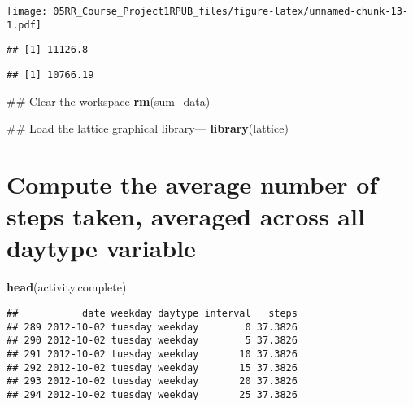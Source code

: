 \documentclass[]{article}
\newenvironment{Shaded}{\begin{snugshade}}{\end{snugshade}}
\newcommand{\KeywordTok}[1]{\textcolor[rgb]{0.13,0.29,0.53}{\textbf{#1}}}
\newcommand{\OperatorTok}[1]{\textcolor[rgb]{0.81,0.36,0.00}{\textbf{#1}}}
\newcommand{\NormalTok}[1]{#1}
\begin{document}
\texttt{[image: 05RR\_Course\_Project1RPUB\_files/figure-latex/unnamed-chunk-13-1.pdf]}

\begin{Shaded}
\end{Shaded}

\begin{verbatim}
## [1] 11126.8
\end{verbatim}

\begin{Shaded}
\end{Shaded}

\begin{verbatim}
## [1] 10766.19
\end{verbatim}

\begin{Shaded}
\begin{Highlighting}[]
\NormalTok{## Clear the workspace}
\KeywordTok{rm}\NormalTok{(sum_data)}

\NormalTok{## Load the lattice graphical library---}
\KeywordTok{library}\NormalTok{(lattice)}
\end{Highlighting}
\end{Shaded}

\section{Compute the average number of steps taken, averaged across all
daytype
variable}\label{compute-the-average-number-of-steps-taken-averaged-across-all-daytype-variable}

\begin{Shaded}
\begin{Highlighting}[]
\KeywordTok{head}\NormalTok{(activity.complete)}
\end{Highlighting}
\end{Shaded}

\begin{verbatim}
##           date weekday daytype interval   steps
## 289 2012-10-02 tuesday weekday        0 37.3826
## 290 2012-10-02 tuesday weekday        5 37.3826
## 291 2012-10-02 tuesday weekday       10 37.3826
## 292 2012-10-02 tuesday weekday       15 37.3826
## 293 2012-10-02 tuesday weekday       20 37.3826
## 294 2012-10-02 tuesday weekday       25 37.3826
\end{verbatim}
\end{document}
